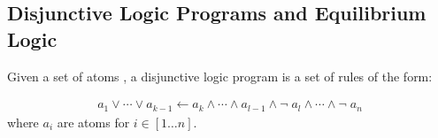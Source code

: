 \subsection{Disjunctive Logic Programs and Equilibrium Logic}

Given a set of atoms , a disjunctive logic program is a set of rules of the form:

\begin{align*}
    a_1 \vee \cdots \vee a_{k-1} \leftarrow a_{k} \wedge \cdots \wedge a_{l-1} \wedge \lnot \; a_{l} \wedge \cdots \wedge \lnot \; a_{n}
\end{align*}
where $a_{i}$ are atoms for $i\in[1\dots n]$.